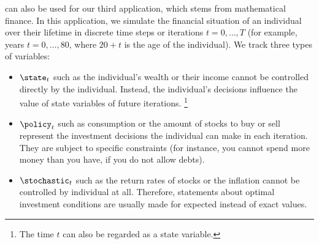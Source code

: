 
\label{chap:80finance}

can also be used for our third application,
which stems from mathematical finance.
In this application, we simulate the financial situation of an individual
over their lifetime in discrete time steps or iterations $t = 0, \dotsc, T$
(for example, years $t = 0, \dotsc, 80$, where $20+t$ is the age
of the individual).
We track three types of variables:

\begin{itemize}
  \item
   $\state_t$
  such as the individual's wealth or their income
  cannot be controlled directly by the individual.
  Instead, the individual's decisions influence the value of
  state variables of future iterations.%
  \footnote{%
    The time $t$ can also be regarded as a state variable.%
  }
  
  \item
   $\policy_t$
  such as consumption or the amount of stocks to buy or sell
  represent the investment decisions the individual can make in
  each iteration.
  They are subject to specific constraints
  (for instance, you cannot spend more money than you have,
  if you do not allow debts).
  
  \item
   $\stochastic_t$
  such as the return rates of stocks or the inflation
  cannot be controlled by individual at all.
  Therefore, statements about optimal investment conditions
  are usually made for expected instead of exact values.
\end{itemize}

\blindtext{}






\cleardoublepage
